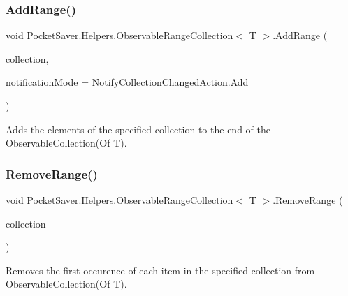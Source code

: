 \subsubsection{\texorpdfstring{Add\+Range()}{AddRange()}}
{\footnotesize\ttfamily void \hyperlink{class_pocket_saver_1_1_helpers_1_1_observable_range_collection}{Pocket\+Saver.\+Helpers.\+Observable\+Range\+Collection}$<$ T $>$.Add\+Range (\begin{DoxyParamCaption}\item[{I\+Enumerable$<$ T $>$}]{collection,  }\item[{Notify\+Collection\+Changed\+Action}]{notification\+Mode = {\ttfamily NotifyCollectionChangedAction.Add} }\end{DoxyParamCaption})\hspace{0.3cm}{\ttfamily [inline]}}



Adds the elements of the specified collection to the end of the Observable\+Collection(\+Of T). 

\mbox{\label{class_pocket_saver_1_1_helpers_1_1_observable_range_collection_a3d2e4bb0b0fb26b3dde6b1419cf46daa}} 
\subsubsection{\texorpdfstring{Remove\+Range()}{RemoveRange()}}
{\footnotesize\ttfamily void \hyperlink{class_pocket_saver_1_1_helpers_1_1_observable_range_collection}{Pocket\+Saver.\+Helpers.\+Observable\+Range\+Collection}$<$ T $>$.Remove\+Range (\begin{DoxyParamCaption}\item[{I\+Enumerable$<$ T $>$}]{collection }\end{DoxyParamCaption})\hspace{0.3cm}{\ttfamily [inline]}}



Removes the first occurence of each item in the specified collection from Observable\+Collection(\+Of T). 

\mbox{\label{class_pocket_saver_1_1_helpers_1_1_observable_range_collection_a238e1f431d4b2ee17a29b51b0a4b0dc8}} 
